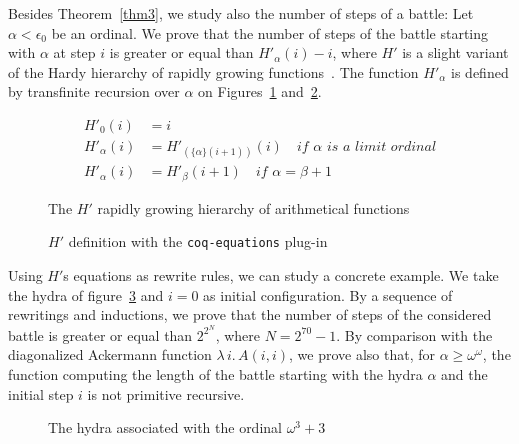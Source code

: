 \documentclass{easychair}
\makeatletter
\newcommand{\inputsnippets}[1]
  {{\setlength{\itemsep}{1pt}\setlength{\parsep}{0pt}%
    \alectryon@copymacros\begin{io}
      \forcsvlist{\item\@inputsnippet}{#1}
    \end{io}}}
\let@old Save definition of 
\newcommand{\@inputsnippet}[1]
  {{\renewenvironment{alectryon}{}{}%
    @old{#1}}}
\newcommand{\canonseq}[2]{\mbox{$\{#1\}(#2)$}}
\makeatother
\begin{document}
 Besides  Theorem~\ref{thm3}, we study also the number of steps of a battle:
Let $\alpha<\epsilon_0$ be an ordinal. 
We prove that  the number of steps of the battle starting with
$\alpha$ at step $i$ is greater or equal than
$H'_\alpha(i)-i$, where $H'$ is a slight variant of the Hardy hierarchy of rapidly growing functions~\cite{BW85, KS81, Promel2013, Wainer1970}.  The function $H'_\alpha$ is defined by transfinite recursion over $\alpha$ on Figures~\ref{fig:hardy-math}
and~\ref{fig:Hprime}.


\begin{figure}[h]
\begin{align}
  H'_0(i) & = i\\
  H'_\alpha(i) &= H'_{(\canonseq{\alpha}{i+1})}(i)  \quad\textit{if $\alpha$ is a limit ordinal}\\
  H'_{\alpha}(i) &=H'_\beta(i+1) \quad\textit{if $\alpha=\beta+1$}
\end{align}  
  \caption{The $H'$ rapidly growing hierarchy of arithmetical functions}
  \label{fig:hardy-math}
\end{figure}


\begin{figure}[h]
  \centering
  \fbox{
    \begin{minipage}[h]{1.0\linewidth}
 \inputsnippets{Hprime_HprimeDef}     
    \end{minipage}}
 \caption{$H'$ definition with the \texttt{coq-equations}
 plug-in~\cite{sozeau:hal-01671777}}
\label{fig:Hprime}
\end{figure}


Using $H'$s equations as rewrite rules, we can study a concrete example. We take the hydra of figure~\ref{fig:start} and $i=0$ as initial configuration. 
By a sequence of rewritings and inductions, we prove that the number of steps of the considered battle is greater or equal than $2^{2^N}$, where $N=2^{70}-1$.
By comparison with the diagonalized Ackermann function $\lambda\,i.\,A(i,i)$, we prove also that, for $\alpha\geq\omega^\omega$, 
the function computing the length of the battle starting with the hydra $\alpha$ and the initial step $i$ is not primitive recursive.

\begin{figure}[h]
  \centering

  \caption{The hydra associated with the ordinal $\omega^3+3$}
  \label{fig:start}
\end{figure}
\end{document}
